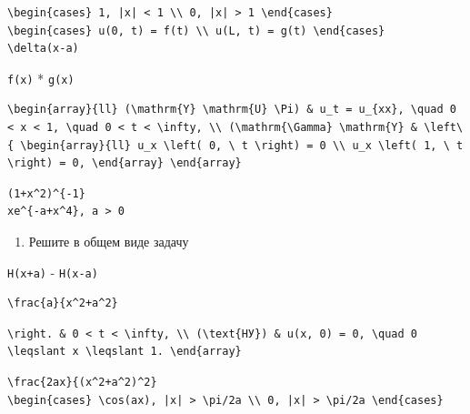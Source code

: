 \documentclass[
  ukrainian,
]{article}
\providecommand{\tightlist}{%
  \setlength{\itemsep}{0pt}\setlength{\parskip}{0pt}}
\begin{document}
\begin{verbatim}
\begin{cases} 1, |x| < 1 \\ 0, |x| > 1 \end{cases}
\begin{cases} u(0, t) = f(t) \\ u(L, t) = g(t) \end{cases}
\delta(x-a)
\end{verbatim}

\texttt{f(x)} * \texttt{g(x)}

\begin{verbatim}
\begin{array}{ll} (\mathrm{Y} \mathrm{U} \Pi) & u_t = u_{xx}, \quad 0 < x < 1, \quad 0 < t < \infty, \\ (\mathrm{\Gamma} \mathrm{Y} & \left\{ \begin{array}{ll} u_x \left( 0, \ t \right) = 0 \\ u_x \left( 1, \ t \right) = 0, \end{array} \end{array}
\end{verbatim}

\begin{verbatim}
(1+x^2)^{-1}
xe^{-a+x^4}, a > 0
\end{verbatim}

\begin{enumerate}
\def\labelenumi{\arabic{enumi}.}
\setcounter{enumi}{1}
\tightlist
\item
  Решите в общем виде задачу
\end{enumerate}

\texttt{H(x+a)} - \texttt{H(x-a)}

\begin{verbatim}
\frac{a}{x^2+a^2}
\end{verbatim}

\begin{verbatim}
\right. & 0 < t < \infty, \\ (\text{НУ}) & u(x, 0) = 0, \quad 0 \leqslant x \leqslant 1. \end{array}
\end{verbatim}

\begin{verbatim}
\frac{2ax}{(x^2+a^2)^2}
\begin{cases} \cos(ax), |x| > \pi/2a \\ 0, |x| > \pi/2a \end{cases}
\end{verbatim}
\end{document}
